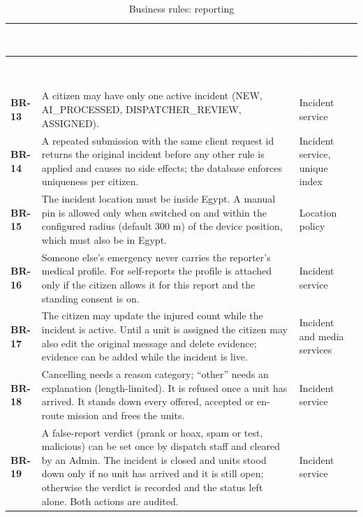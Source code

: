 {\tabfont\rowband
\begin{longtable}{@{}>{\raggedright\arraybackslash}p{}>{\raggedright\arraybackslash}p{}>{\raggedright\arraybackslash}p{}@{}}
\caption{Business rules: reporting}\label{tab:br-reporting}\\
\rowcolor{najdanavy}\textcolor{white}{\sffamily\bfseries\small ID} & \textcolor{white}{\sffamily\bfseries\small Rule} & \textcolor{white}{\sffamily\bfseries\small Enforced in}\\
\endfirsthead
\rowcolor{najdanavy}\textcolor{white}{\sffamily\bfseries\small ID} & \textcolor{white}{\sffamily\bfseries\small Rule} & \textcolor{white}{\sffamily\bfseries\small Enforced in}\\
\endhead
\bottomrule\endlastfoot
\textbf{BR-13} & A citizen may have only one active incident (NEW, AI\_\allowbreak{}PROCESSED, DISPATCHER\_\allowbreak{}REVIEW, ASSIGNED). & Incident service\\
\textbf{BR-14} & A repeated submission with the same client request id returns the original incident before any other rule is applied and causes no side effects; the database enforces uniqueness per citizen. & Incident service, unique index\\
\textbf{BR-15} & The incident location must be inside Egypt. A manual pin is allowed only when switched on and within the configured radius (default 300 m) of the device position, which must also be in Egypt. & Location policy\\
\textbf{BR-16} & Someone else’s emergency never carries the reporter’s medical profile. For self-reports the profile is attached only if the citizen allows it for this report and the standing consent is on. & Incident service\\
\textbf{BR-17} & The citizen may update the injured count while the incident is active. Until a unit is assigned the citizen may also edit the original message and delete evidence; evidence can be added while the incident is live. & Incident and media services\\
\textbf{BR-18} & Cancelling needs a reason category; “other” needs an explanation (length-limited). It is refused once a unit has arrived. It stands down every offered, accepted or en-route mission and frees the units. & Incident service\\
\textbf{BR-19} & A false-report verdict (prank or hoax, spam or test, malicious) can be set once by dispatch staff and cleared by an Admin. The incident is closed and units stood down only if no unit has arrived and it is still open; otherwise the verdict is recorded and the status left alone. Both actions are audited. & Incident service\\

\end{longtable}}

